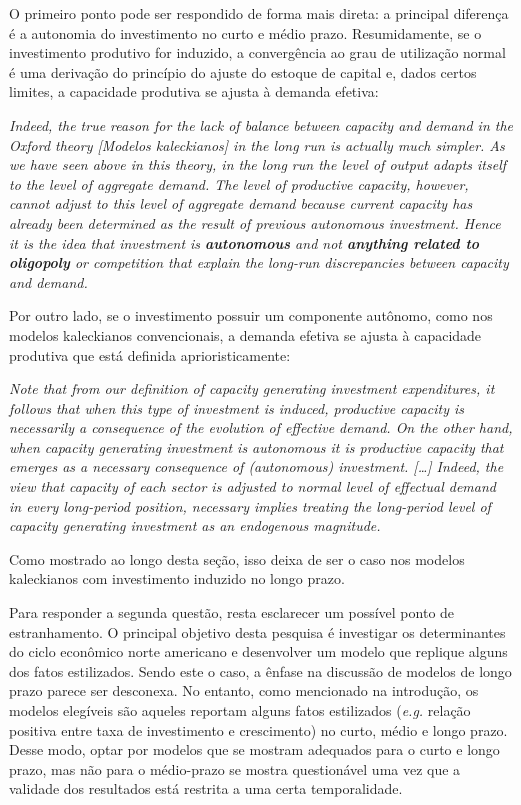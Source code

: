 O primeiro ponto pode ser respondido de forma mais direta: a principal diferença é a autonomia do investimento no curto e médio prazo.  Resumidamente, se o investimento produtivo for induzido, a convergência ao grau de utilização normal é uma derivação do princípio do ajuste do estoque de capital e, dados certos limites, a capacidade produtiva se ajusta à demanda efetiva:

\begin{citacao}
	\textit{Indeed, the true reason for the lack of balance between capacity and demand in the Oxford theory [Modelos kaleckianos] in the long run is actually much simpler. As we have seen above in this theory, in the long run the level of output adapts itself to the level of aggregate demand. The level of productive capacity, however, cannot adjust to this level of aggregate demand because current capacity has already been determined as the result of previous autonomous investment. Hence it is the idea that investment is \textbf{autonomous} and not \textbf{anything related to oligopoly} or competition that explain the long-run discrepancies between capacity and demand.}
	\cite[p.~120, grifos adicionados]{serrano_sraffian_1995}
\end{citacao}
Por outro lado, se o investimento possuir um componente autônomo, como nos modelos kaleckianos convencionais, a demanda efetiva se ajusta à capacidade produtiva que está definida aprioristicamente:
\begin{citacao}
	\textit{Note that from our definition of capacity generating investment expenditures, it follows that when this type of investment is induced, productive capacity is necessarily a consequence of the evolution of effective demand. On the other hand, when capacity generating investment is autonomous it is productive capacity that emerges as a necessary consequence of (autonomous) investment. […] Indeed, the view that capacity of each sector is adjusted to normal level of effectual demand in every long-period position, necessary implies treating the long-period level of capacity generating investment as an endogenous magnitude.} \cite[p.~77]{serrano_sraffian_1995}
\end{citacao}
Como mostrado ao longo desta seção, isso deixa de ser o caso nos modelos kaleckianos com investimento induzido no longo prazo.

Para responder a segunda questão, resta esclarecer um possível ponto de estranhamento. O principal objetivo desta pesquisa é investigar os determinantes do ciclo econômico norte americano e desenvolver um modelo que replique alguns dos fatos estilizados. Sendo este o caso, a ênfase na discussão de modelos de longo prazo parece ser desconexa. 
No entanto, como mencionado na introdução, os modelos elegíveis são aqueles reportam alguns fatos estilizados (\textit{e.g.} relação positiva entre taxa de investimento e crescimento)  no curto, médio e longo prazo.
Desse modo, optar por modelos que se mostram adequados para o curto e longo prazo, mas não para o médio-prazo se mostra questionável uma vez que a validade dos resultados está restrita a uma certa temporalidade. 

